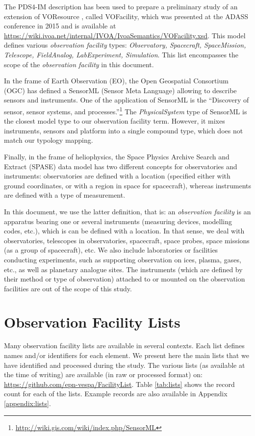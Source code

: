 \documentclass[11pt,a4paper]{ivoa}
\begin{document}
The PDS4-IM description has been used to prepare a preliminary study of
an extension of VOResource \citep{2018ivoa.spec.0625P}, called VOFacility, 
which was presented at the ADASS conference in 2015 \citep{Louys:2015to} 
and is available at \url{https://wiki.ivoa.net/internal/IVOA/IvoaSemantics/VOFacility.xsd}. 
This model defines various \emph{observation facility} types: 
\emph{Observatory, Spacecraft, SpaceMission, Telescope, FieldAnalog,
LabExperiment, Simulation}. This list encompasses the scope of the 
\emph{observation facility} in this document.

In the frame of Earth Observation (EO), the Open Geospatial Consortium
(OGC) has defined a SensorML (Sensor Meta Language) \citep{ogc-sensorml} 
allowing to describe sensors and instruments. One of the application of 
SensorML is the ``Discovery of sensor, sensor systems, and
processes.''\footnote{\url{http://wiki.gis.com/wiki/index.php/SensorML}} 
The \emph{PhysicalSystem} type of SensorML is the closest model type to
our observation facility term.  However, it mixes instruments, sensors 
and platform into a single compound type, which does not match our 
typology mapping. 

Finally, in the frame of heliophysics, the Space Physics Archive Search
and Extract (SPASE) data model \citep{Roberts:2018bi} has two different
concepts for observatories and instruments: observatories are defined 
with a location (specified either with ground coordinates, or with a 
region in space for spacecraft), whereas instruments are defined with 
a type of measurement. 

In this document, we use the latter definition, that is: an 
\emph{observation facility} is an apparatus bearing one or several 
instruments (measuring devices, modelling codes, etc.), which is 
can be defined with a location. In that sense, we deal with observatories, 
telescopes in observatories, spacecraft, space probes, space missions 
(as a group of spacecraft), etc. We also include laboratories or 
facilities conducting  experiments, such as supporting observation on 
ices, plasma, gases, etc., as well as planetary analogue sites. The 
instruments (which are defined by their method or type of observation) 
attached to or mounted on the observation facilities are out of the scope 
of this study.


\section{Observation Facility Lists}
Many observation facility lists are available in several contexts. Each list
defines names and/or identifiers for each element. We present here the main 
lists that we have identified and processed during the study. The various 
lists (as available at the time of writing) are available (in raw or 
processed format) on: \url{https://github.com/epn-vespa/FacilityList}.
Table \ref{tab:lists} shows the record count for each of the lists. 
Example records are also available in Appendix \ref{appendix:lists}. 
\end{document}
